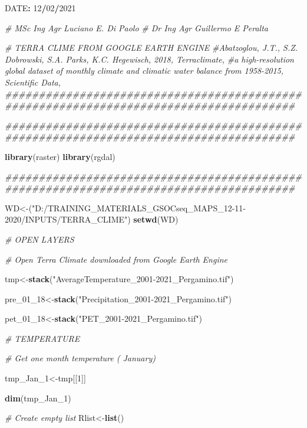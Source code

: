 \documentclass[
  10pt,
  b5paper,
]{book}
\newenvironment{Shaded}{\begin{snugshade}}{\end{snugshade}}
\newcommand{\CommentTok}[1]{\textcolor[rgb]{0.56,0.35,0.01}{\textit{#1}}}
\newcommand{\DecValTok}[1]{\textcolor[rgb]{0.00,0.00,0.81}{#1}}
\newcommand{\KeywordTok}[1]{\textcolor[rgb]{0.13,0.29,0.53}{\textbf{#1}}}
\newcommand{\NormalTok}[1]{#1}
\newcommand{\OperatorTok}[1]{\textcolor[rgb]{0.81,0.36,0.00}{\textbf{#1}}}
\newcommand{\StringTok}[1]{\textcolor[rgb]{0.31,0.60,0.02}{#1}}
\begin{document}
\begin{Shaded}
\begin{Highlighting}[]
\NormalTok{DATE}\OperatorTok{:}\StringTok{ }\DecValTok{12}\OperatorTok{/}\DecValTok{02}\OperatorTok{/}\DecValTok{2021}

\CommentTok{#  MSc Ing Agr Luciano E. Di Paolo}
\CommentTok{#  Dr Ing Agr Guillermo E Peralta}



\CommentTok{# TERRA CLIME FROM GOOGLE EARTH ENGINE}
\CommentTok{#Abatzoglou, J.T., S.Z. Dobrowski, S.A. Parks, K.C. Hegewisch, 2018, Terraclimate, }
\CommentTok{#a high-resolution global dataset of monthly climate and climatic water balance from 1958-2015, Scientific Data,}
\CommentTok{#######################################################################################}

\CommentTok{#######################################################################################}

\KeywordTok{library}\NormalTok{(raster)}
\KeywordTok{library}\NormalTok{(rgdal)}

\CommentTok{#######################################################################################}

\NormalTok{WD<-(}\StringTok{"D:/TRAINING_MATERIALS_GSOCseq_MAPS_12-11-2020/INPUTS/TERRA_CLIME"}\NormalTok{)}
\KeywordTok{setwd}\NormalTok{(WD)}

\CommentTok{# OPEN LAYERS}


\CommentTok{# Open Terra Climate downloaded from Google Earth Engine}

\NormalTok{tmp<-}\KeywordTok{stack}\NormalTok{(}\StringTok{"AverageTemperature_2001-2021_Pergamino.tif"}\NormalTok{)}

\NormalTok{pre_}\DecValTok{01}\NormalTok{_}\DecValTok{18}\NormalTok{<-}\KeywordTok{stack}\NormalTok{(}\StringTok{"Precipitation_2001-2021_Pergamino.tif"}\NormalTok{)}

\NormalTok{pet_}\DecValTok{01}\NormalTok{_}\DecValTok{18}\NormalTok{<-}\KeywordTok{stack}\NormalTok{(}\StringTok{"PET_2001-2021_Pergamino.tif"}\NormalTok{)}

\CommentTok{# TEMPERATURE}


\CommentTok{# Get one month temperature ( January)}

\NormalTok{tmp_Jan_}\DecValTok{1}\NormalTok{<-tmp[[}\DecValTok{1}\NormalTok{]]}

\KeywordTok{dim}\NormalTok{(tmp_Jan_}\DecValTok{1}\NormalTok{)}

\CommentTok{# Create empty list}
\NormalTok{Rlist<-}\KeywordTok{list}\NormalTok{()}


\end{Highlighting}
\end{Shaded}
\end{document}
